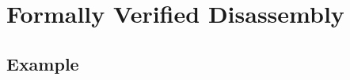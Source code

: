 \section{Formally Verified Disassembly}

\subsection{Example}

\begin{comment}
\begin{frame}[fragile]{Assembly Snippet}
  \begin{block}{32-bit \gls{x86} for display purposes}
    \begin{lstlisting}[style=x64,gobble=6]
      0x0 : 3dc3000000    cmp  eax,c3 |\label{hg-example-cmp}|
      0x5 : 0f8718000000  ja   1c     |\label{hg-example-ja}|
      0xb : 8b0485__a___  mov  eax,DWORD PTR [eax*4+a] |\label{hg-example-jump-table-read}|
      0x12: 8907          mov  DWORD PTR [edi],eax |\label{hg-example-mov1}|
      0x14: c70601000000  mov  DWORD PTR [esi],1   |\label{hg-example-mov2}|
      0x1a: ff27          jmp  DWORD PTR [edi]     |\label{hg-example-indirect-jump}|
    \end{lstlisting}
  \end{block}
\end{frame}
\end{comment}

